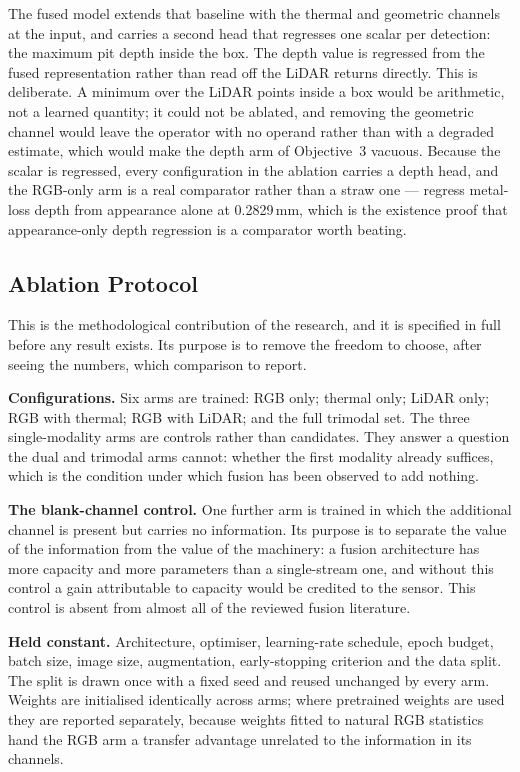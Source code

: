 The fused model extends that baseline with the thermal and geometric channels at
the input, and carries a second head that regresses one scalar per detection:
the maximum pit depth inside the box. The depth value is regressed from the
fused representation rather than read off the LiDAR returns directly. This is
deliberate. A minimum over the LiDAR points inside a box would be arithmetic,
not a learned quantity; it could not be ablated, and removing the geometric
channel would leave the operator with no operand rather than with a degraded
estimate, which would make the depth arm of Objective~3 vacuous. Because the
scalar is regressed, every configuration in the ablation carries a depth head,
and the RGB-only arm is a real comparator rather than a straw one ---
\citet{Egodawela2025} regress metal-loss depth from appearance alone at
0.2829\,mm, which is the existence proof that appearance-only
depth regression is a comparator worth beating.

\subsection{Ablation Protocol}
\label{sec:ablation-protocol}

This is the methodological contribution of the research, and it is specified in
full before any result exists. Its purpose is to remove the freedom to choose,
after seeing the numbers, which comparison to report.

\textbf{Configurations.} Six arms are trained: RGB only; thermal only; LiDAR
only; RGB with thermal; RGB with LiDAR; and the full trimodal set. The three
single-modality arms are controls rather than candidates. They answer a question
the dual and trimodal arms cannot: whether the first modality already suffices,
which is the condition under which fusion has been observed to add nothing.

\textbf{The blank-channel control.} One further arm is trained in which the
additional channel is present but carries no information. Its purpose is to
separate the value of the information from the value of the machinery: a fusion
architecture has more capacity and more parameters than a single-stream one, and
without this control a gain attributable to capacity would be credited to the
sensor. This control is absent from almost all of the reviewed fusion
literature.

\textbf{Held constant.} Architecture, optimiser, learning-rate schedule, epoch
budget, batch size, image size, augmentation, early-stopping criterion and the
data split. The split is drawn once with a fixed seed and reused unchanged by
every arm. Weights are initialised identically across arms; where pretrained
weights are used they are reported separately, because weights fitted to natural
RGB statistics hand the RGB arm a transfer advantage unrelated to the
information in its channels.

